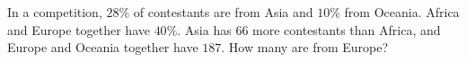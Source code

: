In a competition, $28\%$ of contestants are from Asia and $10\%$ from Oceania. Africa and Europe together have $40\%$. Asia has $66$ more contestants than Africa, and Europe and Oceania together have $187$. How many are from Europe?
